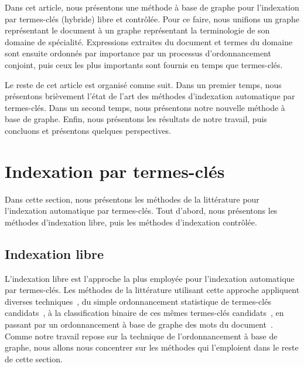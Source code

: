   Dans cet article, nous présentons une méthode à base de graphe pour
  l'indexation par termes-clés (hybride) libre et contrôlée. Pour ce faire, nous
  unifions un graphe représentant le document à un graphe représentant la
  terminologie de son domaine de spécialité. Expressions extraites du document
  et termes du domaine sont ensuite ordonnés par importance par un processus
  d'ordonnancement conjoint, puis ceux les plus importants sont fournis en temps
  que termes-clés.

  Le reste de cet article est organisé comme suit. Dans un premier temps, nous
  présentons brièvement l'état de l'art des méthodes d'indexation automatique
  par termes-clés. Dans un second temps, nous présentons notre nouvelle méthode
  à base de graphe. Enfin, nous présentons les résultats de notre travail, puis
  concluons et présentons quelques perspectives.


\section{Indexation par termes-clés}
\label{sec:main-domain_specific_keyphrase_annotation-state_of_the_art}
  Dans cette section, nous présentons les méthodes de la littérature pour
  l'indexation automatique par termes-clés. Tout d'abord, nous présentons les
  méthodes d'indexation libre, puis les méthodes d'indexation contrôlée.

  \subsection{Indexation libre}
  \label{subsec:main-domain_specific_keyphrase_annotation-state_of_the_art-keyphrase_extraction}
    L'indexation libre est l'approche la plus employée pour l'indexation
    automatique par termes-clés. Les méthodes de la littérature utilisant cette
    approche appliquent diverses techniques~\cite{hasan2014state_of_the_art}, du
    simple ordonnancement statistique de termes-clés
    candidats~\cite{salton1975tfidf}, à la classification binaire de ces mêmes
    termes-clés candidats~\cite{witten1999kea}, en passant par un ordonnancement
    à base de graphe des mots du document~\cite{mihalcea2004textrank}. Comme
    notre travail repose sur la technique de l'ordonnancement à base de graphe,
    nous allons nous concentrer sur les méthodes qui l'emploient dans le reste
    de cette section.

